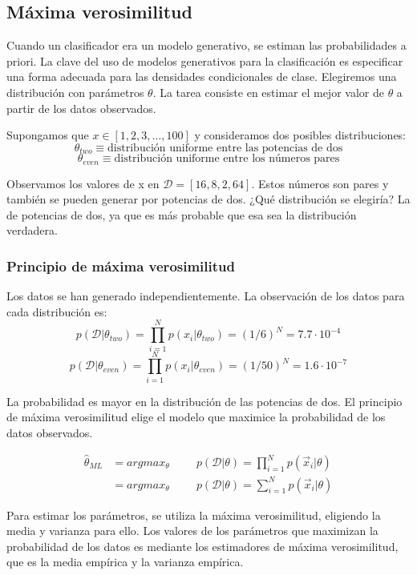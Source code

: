 \subsection{Máxima verosimilitud}
Cuando un clasificador era un modelo generativo, se estiman las probabilidades a priori. La clave del uso de modelos generativos para la clasificación es especificar una forma adecuada para las densidades condicionales de clase. Elegiremos una distribución con parámetros $\theta$. La tarea consiste en estimar el mejor valor de $\theta$ a partir de los datos observados.

Supongamos que $x \in [1, 2, 3, \ldots, 100]$ y consideramos dos posibles distribuciones:
$$\theta_{two} \equiv \text{distribución uniforme entre las potencias de dos}$$
$$\theta_{even} \equiv \text{distribución uniforme entre los números pares}$$

Observamos los valores de x en $\mathcal{D} = [16, 8, 2, 64]$. Estos números son pares y también se pueden generar por potencias de dos. ¿Qué distribución se elegiría? La de potencias de dos, ya que es más probable que esa sea la distribución verdadera.

\subsubsection{Principio de máxima verosimilitud}
Los datos se han generado independientemente. La observación de los datos para cada distribución es:
$$p(\mathcal{D}|\theta_{two}) = \prod_{i=1}^N p(x_i | \theta_{two}) = (1/6)^N = 7.7 \cdot 10^{-4}$$
$$p(\mathcal{D}|\theta_{even}) = \prod_{i=1}^N p(x_i | \theta_{even}) = (1/50)^N = 1.6 \cdot 10^{-7}$$

La probabilidad es mayor en la distribución de las potencias de dos. 
El principio de máxima verosimilitud elige el modelo que maximice la probabilidad de los datos observados.

\begin{align*}
\hat{\theta}_{ML} &= arg max_{\theta}  \hspace{1cm} p(\mathcal{D} | \theta) = \prod^N_{i=1} p(\vec{x}_i|\theta) \\
&= arg max_{\theta} \hspace{1cm} p(\mathcal{D} | \theta) = \sum^N_{i=1} p(\vec{x}_i|\theta)
\end{align*}

Para estimar los parámetros, se utiliza la máxima verosimilitud, eligiendo la media y varianza para ello. Los valores de los parámetros que maximizan la probabilidad de los datos es mediante los estimadores de máxima verosimilitud, que es la media empírica y la varianza empírica.

